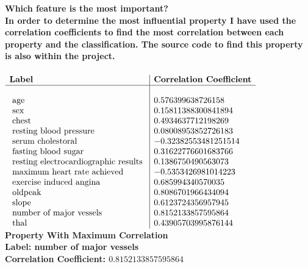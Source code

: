 \begin{enumerate}
\begin{enumerate}
				\bf{Which feature is the most important?} \\
				\textnormal{In order to determine the most influential property I have used the correlation coefficients to find the most correlation between each property and the classification.  The source code to find this property is also within the project.} \\ \\
				\( \begin{array}{l|l}
					\text{\bf{Label}} & \text{\bf{Correlation Coefficient}} \\
					\hline \\
					\text{ age } & 0.576399638726158 \\
					\text{ sex } & 0.15811388300841894 \\
					\text{ chest } & 0.4934637712198269 \\
					\text{ resting blood pressure } & 0.08008953852726183 \\
					\text{ serum cholestoral } & -0.32382553481251514 \\
					\text{ fasting blood sugar } & 0.31622776601683766 \\
					\text{ resting electrocardiographic results } & 0.1386750490563073 \\
					\text{ maximum heart rate achieved } & -0.5353426981014223 \\
					\text{ exercise induced angina } & 0.685994340570035 \\
					\text{ oldpeak } & 0.8086701966434094 \\
					\text{ slope } & 0.6123724356957945 \\
					\text{ number of major vessels } & 0.8152133857595864 \\
					\text{ thal } & 0.43905703995876144 \\
				\end{array} \) \\
				
				\bf{ Property With Maximum Correlation} \\ 
				Label:  \textnormal{number of major vessels} \\
				Correlation Coefficient: \(0.8152133857595864\)
		\end{enumerate}

\end{enumerate}

